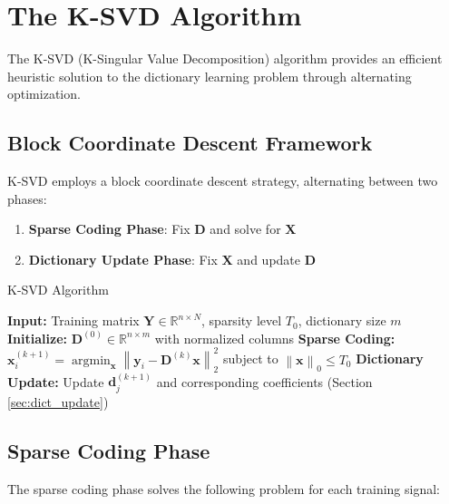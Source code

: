 \documentclass[12pt]{article}
\renewcommand{\vec}[1]{\mathbf{#1}}
\DeclareMathOperator{\argmin}{argmin}
\newcommand{\norm}[1]{\left\|#1\right\|}
\newcommand{\R}{\mathbb{R}}
\theoremstyle{definition}
\begin{document}
\newpage

\section{The K-SVD Algorithm}

The K-SVD (K-Singular Value Decomposition) algorithm provides an efficient heuristic solution to the dictionary learning problem through alternating optimization.

\subsection{Block Coordinate Descent Framework}

K-SVD employs a block coordinate descent strategy, alternating between two phases:

\begin{enumerate}
    \item \textbf{Sparse Coding Phase}: Fix $\mathbf{D}$ and solve for $\mathbf{X}$
    \item \textbf{Dictionary Update Phase}: Fix $\mathbf{X}$ and update $\mathbf{D}$
\end{enumerate}

\begin{algorithm}[H]
    \caption{K-SVD Algorithm}
    \begin{algorithmic}[1]
        \STATE \textbf{Input:} Training matrix $\mathbf{Y} \in \R^{n \times N}$, sparsity level $T_0$, dictionary size $m$
        \STATE \textbf{Initialize:} $\mathbf{D}^{(0)} \in \R^{n \times m}$ with normalized columns
        \STATE \textbf{Sparse Coding:}
        \STATE $\vec{x}_i^{(k+1)} = \argmin_{\vec{x}} \norm{\vec{y}_i - \mathbf{D}^{(k)}\vec{x}}_2^2$ subject to $\norm{\vec{x}}_0 \leq T_0$
        \ENDFOR
        \STATE \textbf{Dictionary Update:}
        \STATE Update $\vec{d}_j^{(k+1)}$ and corresponding coefficients (Section \ref{sec:dict_update})
        \ENDFOR
        \ENDFOR
    \end{algorithmic}
\end{algorithm}

\subsection{Sparse Coding Phase}

The sparse coding phase solves the following problem for each training signal:
\end{document}
